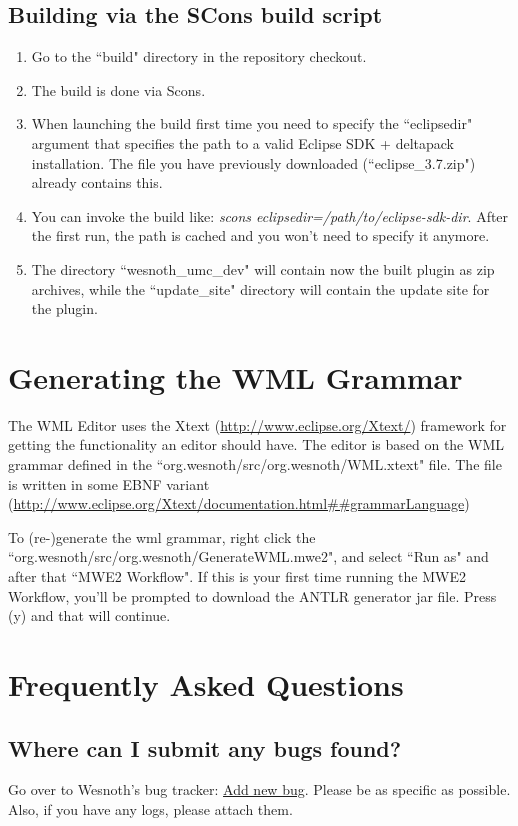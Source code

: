 \documentclass[10pt]{article}
\begin{document}
\subsection{Building via the SCons build script}
\begin{enumerate}
    \item Go to the ``build" directory in the repository checkout.
    \item The build is done via Scons.
    \item When launching the build first time you need to specify the ``eclipsedir" argument that specifies the path to a valid Eclipse SDK + deltapack installation. The file you have previously downloaded (``eclipse\_3.7.zip") already contains this.
    \item You can invoke the build like: \textit{scons  eclipsedir=/path/to/eclipse-sdk-dir}. After the first run, the path is cached and you won't need to specify it anymore.
    \item The directory ``wesnoth\_umc\_dev" will contain now the built plugin as zip archives, while the ``update\_site" directory will contain the update site for the plugin.
\end{enumerate}

\section{Generating the WML Grammar}
The WML Editor uses the Xtext (\url{http://www.eclipse.org/Xtext/}) framework for getting the functionality an editor should have. The editor is based on the WML grammar defined in the ``org.wesnoth/src/org.wesnoth/WML.xtext" file.
The file is written in some EBNF variant (\url{http://www.eclipse.org/Xtext/documentation.html\#\#grammarLanguage})

To (re-)generate the wml grammar, right click the ``org.wesnoth/src/org.wesnoth/GenerateWML.mwe2", and select ``Run as" and after that ``MWE2 Workflow". If this is your first time running the MWE2 Workflow, you'll be prompted to download the ANTLR generator jar file. Press (y) and that will continue.

\section{Frequently Asked Questions}
\subsection{Where can I submit any bugs found?}
Go over to Wesnoth's bug tracker: \href{https://gna.org/bugs/?func=additem&group=wesnoth&bug_group_id=116}{Add new bug}. Please be as specific as possible. Also, if you have any logs, please attach them.
\end{document}
